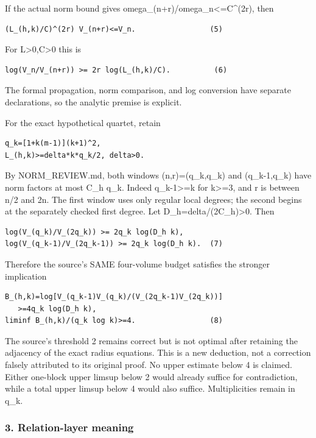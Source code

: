If the actual norm bound gives omega\_(n+r)/omega\_n\textless=C\^{}(2r), then

\begin{verbatim}
(L_(h,k)/C)^(2r) V_(n+r)<=V_n.                 (5)
\end{verbatim}

For L\textgreater0,C\textgreater0 this is

\begin{verbatim}
log(V_n/V_(n+r)) >= 2r log(L_(h,k)/C).          (6)
\end{verbatim}

The formal propagation, norm comparison, and log conversion have separate declarations, so the analytic premise is explicit.

For the exact hypothetical quartet, retain

\begin{verbatim}
q_k=[1+k(m-1)](k+1)^2,
L_(h,k)>=delta*k*q_k/2, delta>0.
\end{verbatim}

By NORM\_REVIEW.md, both windows (n,r)=(q\_k,q\_k) and (q\_k-1,q\_k) have norm factors at most C\_h q\_k. Indeed q\_k-1\textgreater=k for k\textgreater=3, and r is between n/2 and 2n. The first window uses only regular local degrees; the second begins at the separately checked first degree. Let D\_h=delta/(2C\_h)\textgreater0. Then

\begin{verbatim}
log(V_(q_k)/V_(2q_k)) >= 2q_k log(D_h k),
log(V_(q_k-1)/V_(2q_k-1)) >= 2q_k log(D_h k).  (7)
\end{verbatim}

Therefore the source's SAME four-volume budget satisfies the stronger implication

\begin{verbatim}
B_(h,k)=log[V_(q_k-1)V_(q_k)/(V_(2q_k-1)V_(2q_k))]
   >=4q_k log(D_h k),
liminf B_(h,k)/(q_k log k)>=4.                 (8)
\end{verbatim}

The source's threshold 2 remains correct but is not optimal after retaining the adjacency of the exact radius equations. This is a new deduction, not a correction falsely attributed to its original proof. No upper estimate below 4 is claimed. Either one-block upper limsup below 2 would already suffice for contradiction, while a total upper limsup below 4 would also suffice. Multiplicities remain in q\_k.

\subsubsection{3. Relation-layer meaning}\label{endpoint-pr25_consecutive_original--relation-layer-meaning}

